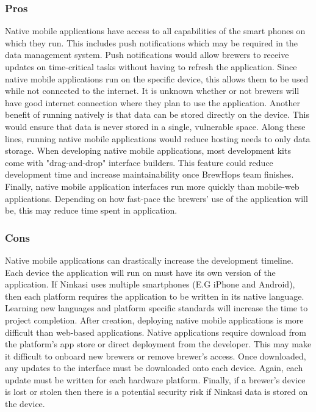 \documentclass[draftclsnofoot,onecolumn,letterpaper,10pt,compsoc]{IEEEtran}
\begin{document}
        \subsubsection{Pros}
            Native mobile applications have access to all capabilities of the smart phones on which they run. 
            This includes push notifications which may be required in the data management system. 
            Push notifications would allow brewers to receive updates on time-critical tasks without having to refresh the application.
            Since native mobile applications run on the specific device, this allows them to be used while not connected to the internet.
            It is unknown whether or not brewers will have good internet connection where they plan to use the application.
            Another benefit of running natively is that data can be stored directly on the device.
            This would ensure that data is never stored in a single, vulnerable space.
            Along these lines, running native mobile applications would reduce hosting needs to only data storage.
            When developing native mobile applications, most development kits come with "drag-and-drop" interface builders. 
            This feature could reduce development time and increase maintainability once BrewHops team finishes.
            Finally, native mobile application interfaces run more quickly than mobile-web applications.
            Depending on how fast-pace the brewers' use of the application will be, this may reduce time spent in application.

        \subsubsection{Cons}
            Native mobile applications can drastically increase the development timeline.
            Each device the application will run on must have its own version of the application.
            If Ninkasi uses multiple smartphones (E.G iPhone and Android), then each platform requires the application to be written in its native language.
            Learning new languages and platform specific standards will increase the time to project completion.
            After creation, deploying native mobile applications is more difficult than web-based applications.
            Native applications require download from the platform's app store or direct deployment from the developer.
            This may make it difficult to onboard new brewers or remove brewer's access.
            Once downloaded, any updates to the interface must be downloaded onto each device.
            Again, each update must be written for each hardware platform.
            Finally, if a brewer's device is lost or stolen then there is a potential security risk if Ninkasi data is stored on the device.
    
\end{document}
